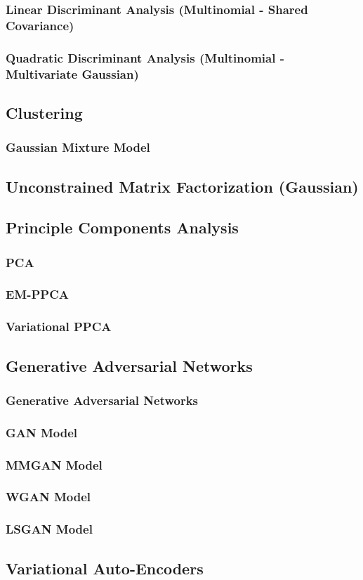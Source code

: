 \subsubsection{Linear Discriminant Analysis (Multinomial - Shared Covariance)}
\subsubsection{Quadratic Discriminant Analysis (Multinomial - Multivariate Gaussian)}

\subsection{Clustering}
\subsubsection{Gaussian Mixture Model}

\subsection{Unconstrained Matrix Factorization (Gaussian)}

\subsection{Principle Components Analysis}
\subsubsection{PCA}
\subsubsection{EM-PPCA}
\subsubsection{Variational PPCA}

\subsection{Generative Adversarial Networks}
\subsubsection{Generative Adversarial Networks}
\subsubsection{GAN Model}
\subsubsection{MMGAN Model}
\subsubsection{WGAN Model}
\subsubsection{LSGAN Model}

\subsection{Variational Auto-Encoders}
